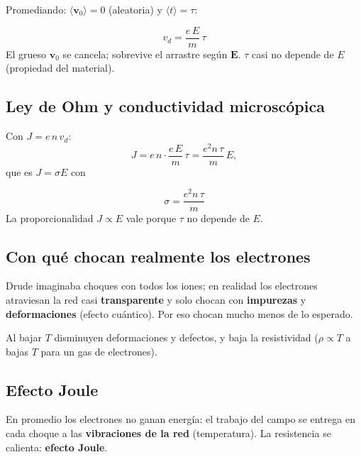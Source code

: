 \documentclass[12pt,a4paper]{article}
\begin{document}
Promediando: $\langle\mathbf{v}_0\rangle = 0$ (aleatoria) y
$\langle t\rangle = \tau$:

\begin{keybox}
  \[
  \boxed{v_d = \frac{e\,E}{m}\,\tau}
  \]
  El grueso $\mathbf{v}_0$ se cancela; sobrevive el arrastre según
  $\mathbf{E}$. $\tau$ casi no depende de $E$ (propiedad del material).
\end{keybox}



\subsection{Ley de Ohm y conductividad microscópica}

Con $J = e\,n\,v_d$:
\[
J = e\,n\cdot\frac{e\,E}{m}\,\tau = \frac{e^2 n\,\tau}{m}\,E,
\]
que es $J = \sigma E$ con

\begin{keybox}
  \[
  \boxed{\sigma = \frac{e^2 n\,\tau}{m}}
  \]
  La proporcionalidad $J\propto E$ vale porque $\tau$ no depende de $E$.
\end{keybox}

\subsection{Con qué chocan realmente los electrones}

Drude imaginaba choques con todos los iones; en realidad los electrones
atraviesan la red casi \textbf{transparente} y solo chocan con
\textbf{impurezas} y \textbf{deformaciones} (efecto cuántico). Por eso
chocan mucho menos de lo esperado.

\begin{notebox}[Temperatura]
  Al bajar $T$ disminuyen deformaciones y defectos, y baja la
  resistividad ($\rho \propto T$ a bajas $T$ para un gas de electrones).
\end{notebox}

\subsection{Efecto Joule}

En promedio los electrones no ganan energía: el trabajo del campo se
entrega en cada choque a las \textbf{vibraciones de la red}
(temperatura). La resistencia se calienta: \textbf{efecto Joule}.

\end{document}
